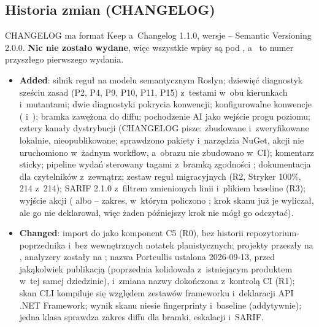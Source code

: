 \subsection{Historia zmian (CHANGELOG)}\label{sec:portcullis-changelog}

CHANGELOG ma format Keep a~Changelog 1.1.0, wersje -- Semantic Versioning 2.0.0.
\textbf{Nic nie zostało wydane}, więc wszystkie wpisy są pod \repopath{[Unreleased]},
a~ to numer przyszłego pierwszego wydania.

\begin{itemize}[leftmargin=*]
  \item \textbf{Added}: silnik reguł na modelu semantycznym Roslyn; dziewięć diagnostyk
        sześciu zasad (P2, P4, P9, P10, P11, P15) z~testami w~obu kierunkach i~mutantami;
        dwie diagnostyki pokrycia konwencji; konfigurowalne konwencje
        ( i~); bramka zawężona do diffu;
        pochodzenie AI jako wejście progu poziomu; cztery kanały dystrybucji (CHANGELOG pisze:
        zbudowane i~zweryfikowane lokalnie, nieopublikowane; sprawdzono pakiety i~narzędzia
        NuGet, akcji nie uruchomiono w~żadnym workflow, a~obrazu nie zbudowano w~CI);
        komentarz sticky; pipeline wydań
        sterowany tagami z~bramką zgodności ; dokumentacja dla czytelników
        z~zewnątrz; zestaw reguł migracyjnych (R2, Stryker 100\%, 214 z~214); SARIF 2.1.0
        z~filtrem zmienionych linii i~plikiem baseline (R3); wyjście 
        akcji ( albo  -- zakres, w~którym policzono
        ; krok skanu już je wyliczał, ale 
        go nie deklarował, więc żaden późniejszy krok nie mógł go odczytać).
  \item \textbf{Changed}: import do  jako komponent C5 (R0),
        bez historii repozytorium-poprzednika i~bez wewnętrznych notatek planistycznych;
        projekty  przeszły na , analyzery zostały na
        ; nazwa Portcullis ustalona 2026-09-13, przed jakąkolwiek
        publikacją (poprzednia kolidowała z~istniejącym produktem w~tej samej dziedzinie),
        i~zmiana nazwy dokończona z~kontrolą CI (R1); skan CLI kompiluje się względem
        zestawów frameworku i~deklaracji API .NET Framework; wynik skanu niesie fingerprinty
        i~baseline (addytywnie); jedna klasa sprawdza zakres diffu dla bramki, eskalacji
        i~SARIF.

\end{itemize}
